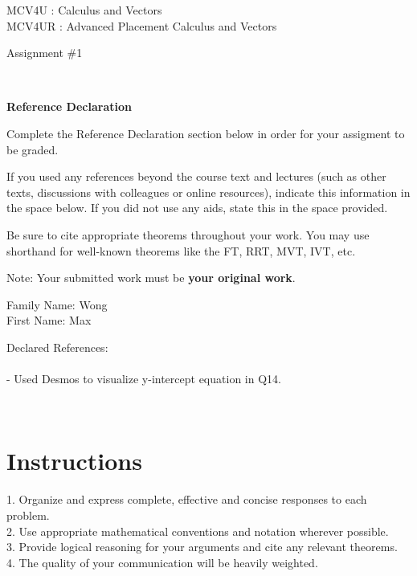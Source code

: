 \documentclass[12pt]{book}
\begin{document}
\vspace{-1.0in}\begin{center}
\Large{MCV4U : Calculus and Vectors}\\
\Large{MCV4UR : Advanced Placement Calculus and Vectors }

\Large{Assignment \#1}


\end{center}


\vspace{0.015in}\hrulefill\ 

\textbf{Reference Declaration} %

Complete the Reference Declaration section below in order for your assigment to be graded.

If you used any references beyond the course text and lectures (such as other texts, discussions with colleagues or online resources), indicate this information in the space below.  If you did not use any aids, state this in the space provided. 

Be sure to cite appropriate theorems throughout your work. You may use shorthand for well-known theorems like the FT, RRT, MVT, IVT, etc. 

Note: Your submitted work must be \textbf{your original work}. 

Family Name: Wong\\%
First Name: Max %

Declared References: 
\\
\\
- Used Desmos to visualize y-intercept equation in Q14.

\vspace{0.015in}\hrulefill\ 

\newpage

\section*{Instructions}

\begin{center}
\setlength{\fboxrule}{2pt}
\begin{boxedminipage}{6.5in}
1.	Organize and express complete, effective and concise responses to each problem.\\
2.	Use appropriate mathematical conventions and notation wherever possible.\\
3.	Provide logical reasoning for your arguments and cite any relevant theorems. \\
4.  The quality of your communication will be heavily weighted.
\end{boxedminipage}
\end{center} 
\end{document}
